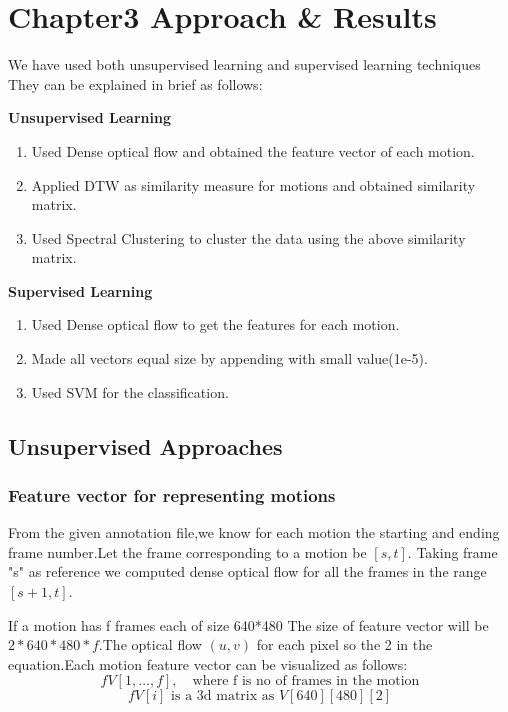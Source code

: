 
\chapter{Chapter3 Approach \& Results} %

\label{ChapterX} %

We have used both unsupervised learning and supervised learning techniques They can be explained in brief as follows:

\textbf{Unsupervised Learning}
\begin{enumerate}
    \item Used Dense optical flow and obtained the feature vector of each motion.
    \item Applied DTW  as similarity measure for motions and obtained similarity matrix.
    \item Used Spectral Clustering to cluster the data using the above similarity matrix.
\end{enumerate}

\textbf{Supervised Learning}
\begin{enumerate}
    \item Used Dense optical flow to get the features for each motion.
    \item Made all vectors equal size by appending with small value(1e-5).
    \item Used SVM for the classification.
\end{enumerate}
\section{Unsupervised Approaches}
\subsection{Feature vector for representing motions}
From the given annotation file,we know for each motion the starting and ending frame number.Let the frame corresponding to a motion be $[s,t]$.
Taking frame "s" as reference we computed dense optical flow for all the frames in the range $[s+1,t]$.

If a motion has f frames each of size 640*480
The size of feature vector will be $2*640*480*f$.The optical flow $(u,v)$ for each pixel so the 2 in the equation.Each motion feature vector can be visualized as follows:
    \[fV[1,\dots,f] , \quad \text{where f is no of frames in the motion}\]
    \[fV[i] \text{ is a 3d matrix as } V[640][480][2] \]
    
